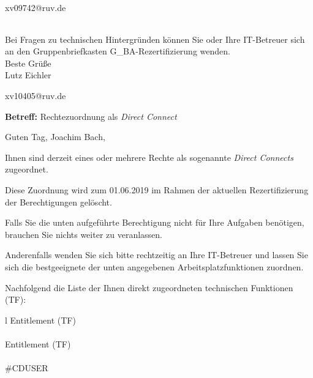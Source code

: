 \documentclass[a4paper,landscape,12pt]{letter}
\begin{document}
\begin{letter}{xv09742@ruv.de\hfill \break}
\begin{tiny}
\begin{longtable}{|p{35mm}|p{15mm}|p{25mm}|p{10mm}|p{40mm}|p{50mm}|p{50mm}|}
\hline
		\end{longtable}
		\end{tiny}
	
\begin{minipage}{\textwidth}
			Bei Fragen zu technischen Hintergründen können Sie 
			oder Ihre IT-Betreuer sich an den Gruppenbriefkasten 
			G\_BA-Rezertifizierung
			wenden.\\
			\linebreak
			Beste Grüße\\
			Lutz Eichler
	\end{minipage}
	\end{letter}
	
\begin{letter}{xv10405@ruv.de\hfill \break}
\begin{normalsize}
	\opening{\textbf{Betreff:} Rechtezuordnung als \emph{Direct Connect}}
	\begin{normalsize} \hfill
	\end{normalsize}

	\begin{normalsize}
		Guten Tag, 
	Joachim Bach, \hfill \break
	\end{normalsize}
	\end{normalsize}
	
\begin{normalsize}
	Ihnen sind derzeit eines oder mehrere Rechte als sogenannte \emph{Direct Connects} zugeordnet.
	
	Diese Zuordnung wird zum 01.06.2019 im Rahmen der aktuellen Rezertifizierung der Berechtigungen gelöscht.
	
	Falls Sie die unten aufgeführte Berechtigung nicht für Ihre Aufgaben benötigen, 
	brauchen Sie nichts weiter zu veranlassen.
	
	Anderenfalls wenden Sie sich bitte rechtzeitig an Ihre IT-Betreuer 
	und lassen Sie sich die bestgeeignete der unten angegebenen Arbeitsplatzfunktionen zuordnen.
	\end{normalsize}
	
\begin{normalsize}
	Nachfolgend die Liste der Ihnen direkt zugeordneten technischen Funktionen (TF):

	\begin{longtable}{l}
		Entitlement (TF) \\ \hline
		\endfirsthead
		\\\hline
		Entitlement (TF) \\ \hline
		\endhead %
		\multicolumn{1}{r@{}}{Fortsetzung \ldots}\\
		\endfoot
		\hline
		\endlastfoot
	\#CDUSER\\
	\end{longtable}
	\end{normalsize}
	

\end{letter}
\end{document}
